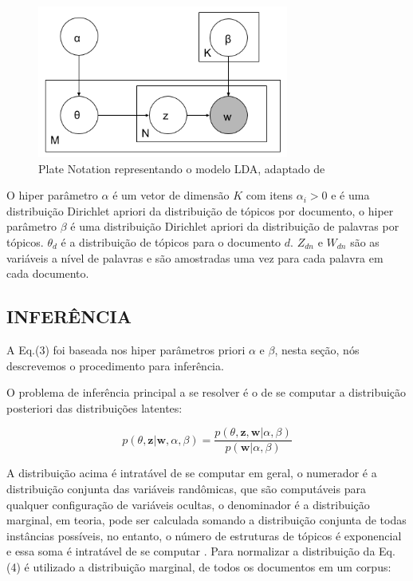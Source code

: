 \documentclass[12pt,a4paper]{article}
\begin{document}
  \begin{figure}[H]
   \centering
     \includegraphics[height=5cm]{images/figure_1.png}
     \caption{Plate Notation representando o modelo LDA, adaptado de }
     \label{fig-plate}
  \end{figure}
  
  O hiper parâmetro $\alpha$ é um vetor de dimensão $K$ com itens \(\alpha _i>0\) e é uma distribuição Dirichlet apriori da distribuição de tópicos por documento,
  o hiper parâmetro $\beta$ é uma distribuição Dirichlet apriori da distribuição de palavras por tópicos. $\theta _d$ é a distribuição de tópicos para o documento $d$. $Z_{dn}$ e $W_{dn}$ são as variáveis a nível de palavras e são amostradas uma vez para cada palavra em cada documento.
  
  
  \subsection{INFERÊNCIA}
  A Eq.(3) foi baseada nos hiper parâmetros priori $\alpha$ e $\beta$, nesta seção, nós descrevemos o procedimento para inferência.
  
  O problema de inferência principal a se resolver é o de se computar a distribuição posteriori das distribuições latentes:
  
  \begin{equation}
  p(\theta,\textbf{z}|\textbf{w},\alpha,\beta) = \frac{p(\theta,\textbf{z},\textbf{w}|\alpha,\beta)}{p(\textbf{w}|\alpha,\beta)}
  \end{equation}
  
  A distribuição acima é intratável de se computar em geral, o numerador é a distribuição conjunta das variáveis randômicas, que são computáveis para qualquer configuração de variáveis ocultas,
   o denominador é a distribuição marginal, em teoria, pode ser calculada somando a distribuição conjunta de todas instâncias possíveis, no entanto,
   o número de estruturas de tópicos é exponencial e essa soma é intratável de se computar \cite{blei2012probabilistic}. Para normalizar a distribuição da Eq.(4) é utilizado a distribuição marginal,
   de todos os documentos em um corpus:
  
\end{document}
